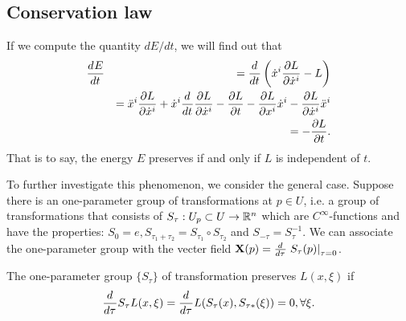 \subsection{Conservation law}
If we compute the quantity $dE/dt$, we will find out that
\begin{eqnarray}
\frac{d^{} E}{d t^{}} &&= \frac{d^{}  }{d t^{}} \left( \dot{x}^i \frac{ \partial L}{ \partial \dot{x}^i } - L\right)
\nonumber\\
&&= \ddot{x}^i \frac{ \partial L}{ \partial \dot{x}^i } + \dot{x}^i \frac{d^{}  }{d t^{}}\frac{ \partial L}{ \partial \dot{x}^i } - \frac{ \partial L}{ \partial t } - \frac{ \partial L}{ \partial x^i }\dot{x}^i - \frac{ \partial L}{ \partial \dot{x}^i } \ddot{x}^i
\nonumber\\
&&= -\frac{ \partial L}{ \partial t }.
\nonumber
\end{eqnarray}
That is to say, the energy $E$ preserves if and only if $L$ is independent of $t$.

To further investigate this phenomenon, we consider the general case. Suppose there is an one-parameter group of transformations at $p \in U$, i.e. a group of transformations that consists of $S_{\tau}: U_p \subset U \rightarrow \mathbb{R}^n$ which are $C^{\infty}$-functions and have the properties: $S_0 = e, S_{\tau_1 + \tau_2} = S_{\tau_1} \circ S_{\tau_2}$ and $S_{-\tau} = S_{\tau}^{-1}$. We can associate the one-parameter group with the vecter field $\mathbf{X}(p) = \frac{d^{}  }{d \tau^{}}\left. S_{\tau}(p) \right|_{\tau = 0}$.

\begin{definition}
	The one-parameter group $\{S_{\tau}\}$ of transformation preserves $L(x, \xi)$ if
	\begin{eqnarray}
		\frac{d^{}  }{d \tau^{}} S_{\tau} L(x, \xi) = \frac{d^{}  }{d \tau^{}}L(S_{\tau}(x), S_{\tau *}(\xi)) = 0, \forall \xi.
		\label{cond:preserve_L}
	\end{eqnarray}
\end{definition}

